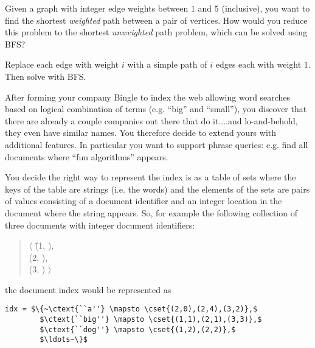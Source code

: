
\begin{problem}

\freeresponse

Given a graph with integer edge weights between $1$ and $5$
(inclusive), you want to find the shortest \emph{weighted} path
between a pair of vertices.  How would you reduce this problem to the
shortest \emph{unweighted} path problem, which can be solved using
BFS?

\sol
  Replace each edge with weight $i$ with a simple path of $i$ edges
  each with weight $1$. Then solve with BFS.
\end{problem}




After forming your company Bingle to index the web allowing word
searches based on logical combination of terms (e.g. ``big'' and
``small''), you discover that there are already a couple companies out
there that do it....and lo-and-behold, they even have similar names.
You therefore decide to extend yours with additional features.  In
particular you want to support phrase queries: e.g. find all
documents where ``fun algorithms'' appears.

You decide the right way to represent the index is as a table of sets
where the keys of the table are strings (i.e. the words) and the
elements of the sets are pairs of values consisting of a document
identifier and an integer location in the document where the string
appears.  So, for example the following collection of three documents
with integer document identifiers:

\begin{quote}
\begin{tabbing}
 $\langle$
  \=(1, ), \\
  \>(2, ),\\
  \>(3, ) $\rangle$
\end{tabbing}
\end{quote}

the document index would be represented as
\begin{lstlisting}[numbers=none]
idx = $\{~\ctext{``a''} \mapsto \cset{(2,0),(2,4),(3,2)},$
        $\ctext{``big''} \mapsto \cset{(1,1),(2,1),(3,3)},$
        $\ctext{``dog''} \mapsto \cset{(1,2),(2,2)},$
        $\ldots~\}$
\end{lstlisting}

